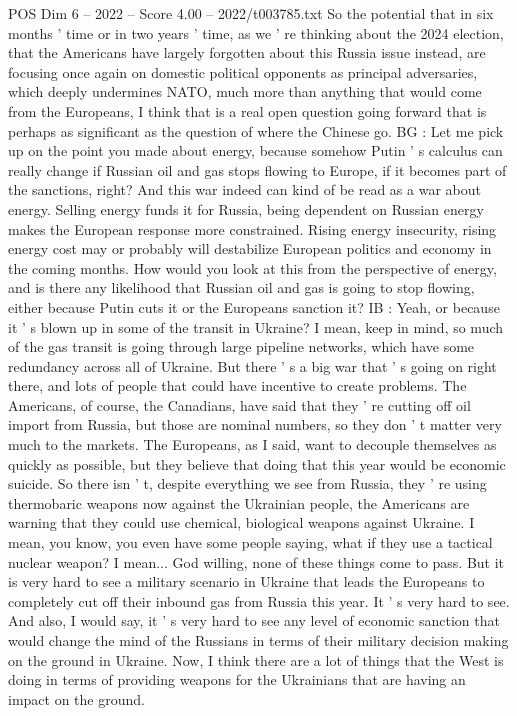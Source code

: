 \begin{textsample}{POS Dim 6 – 2022 – Score 4.00 – 2022/t003785.txt}
So the potential that in six months ' time or in two years ' time, as we ' re thinking about the 2024 election, that the Americans have largely forgotten about this Russia issue instead, are focusing once again on domestic political opponents as principal adversaries, which deeply undermines NATO, much more than anything that would come from the Europeans, I think that is a real open question going forward that is perhaps as significant as the question of where the Chinese go.
BG : Let me pick up on the point you made about energy, because somehow Putin ' s calculus can really change if Russian oil and gas stops flowing to Europe, if it becomes part of the sanctions, right?
And this war indeed can kind of be read as a war about energy.
Selling energy funds it for Russia, being dependent on Russian energy makes the European response more constrained.
Rising energy insecurity, rising energy cost may or probably will destabilize European politics and economy in the coming months.
How would you look at this from the perspective of energy, and is there any likelihood that Russian oil and gas is going to stop flowing, either because Putin cuts it or the Europeans sanction it?
IB : Yeah, or because it ' s blown up in some of the transit in Ukraine?
I mean, keep in mind, so much of the gas transit is going through large pipeline networks, which have some redundancy across all of Ukraine.
But there ' s a big war that ' s going on right there, and lots of people that could have incentive to create problems.
The Americans, of course, the Canadians, have said that they ' re cutting off oil import from Russia, but those are nominal numbers, so they don ' t matter very much to the markets.
The Europeans, as I said, want to decouple themselves as quickly as possible, but they believe that doing that this year would be economic suicide.
So there isn ' t, despite everything we see from Russia, they ' re using thermobaric weapons now against the Ukrainian people, the Americans are warning that they could use chemical, biological weapons against Ukraine.
I mean, you know, you even have some people saying, what if they use a tactical nuclear weapon?
I mean...
God willing, none of these things come to pass.
But it is very hard to see a military scenario in Ukraine that leads the Europeans to completely cut off their inbound gas from Russia this year.
It ' s very hard to see.
And also, I would say, it ' s very hard to see any level of economic sanction that would change the mind of the Russians in terms of their military decision making on the ground in Ukraine.
Now, I think there are a lot of things that the West is doing in terms of providing weapons for the Ukrainians that are having an impact on the ground.

\end{textsample}
